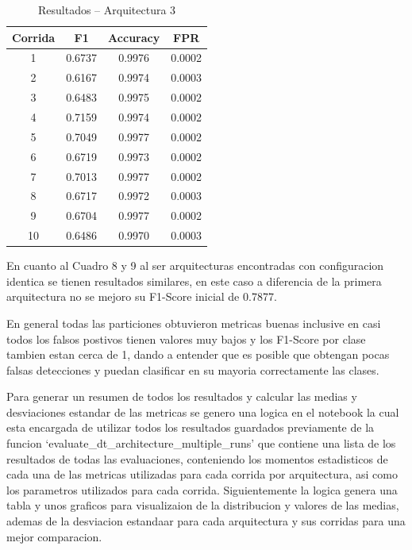 \documentclass[12pt,a4paper]{article}
\begin{document}
\begin{table}[H]
  \centering
  \begin{tabular}{c c c c}
    \hline
    Corrida & F1 & Accuracy & FPR \\
    \hline
    1  & 0.6737 & 0.9976 & 0.0002 \\
    2  & 0.6167 & 0.9974 & 0.0003 \\
    3  & 0.6483 & 0.9975 & 0.0002 \\
    4  & 0.7159 & 0.9974 & 0.0002 \\
    5  & 0.7049 & 0.9977 & 0.0002 \\
    6  & 0.6719 & 0.9973 & 0.0002 \\
    7  & 0.7013 & 0.9977 & 0.0002 \\
    8  & 0.6717 & 0.9972 & 0.0003 \\
    9  & 0.6704 & 0.9977 & 0.0002 \\
    10 & 0.6486 & 0.9970 & 0.0003 \\
    \hline
  \end{tabular}
  \caption{Resultados – Arquitectura 3}
  \label{tab:corridas_arq3}
\end{table}

En cuanto al Cuadro 8 y 9 al ser arquitecturas encontradas con configuracion identica se tienen resultados similares,
en este caso a diferencia de la primera arquitectura no se mejoro su F1-Score inicial de 0.7877.

En general todas las particiones obtuvieron metricas buenas inclusive en casi todos los falsos postivos tienen valores
muy bajos y los F1-Score por clase tambien estan cerca de 1, dando a entender que es posible que obtengan
pocas falsas detecciones y puedan clasificar en su mayoria correctamente las clases.

Para generar un resumen de todos los resultados y calcular las medias y desviaciones estandar de las metricas se genero una logica
en el notebook la cual esta encargada de utilizar todos los resultados guardados previamente de la funcion `evaluate_dt_architecture_multiple_runs'
que contiene una lista de los resultados de todas las evaluaciones, conteniendo los momentos estadisticos de
cada una de las metricas utilizadas para cada corrida por arquitectura, asi como los parametros utilizados para cada corrida.
Siguientemente la logica genera una tabla y unos graficos para visualizaion de la distribucion y valores de las medias, ademas de la desviacion estandaar
para cada arquitectura y sus corridas para una mejor comparacion.
\end{document}
